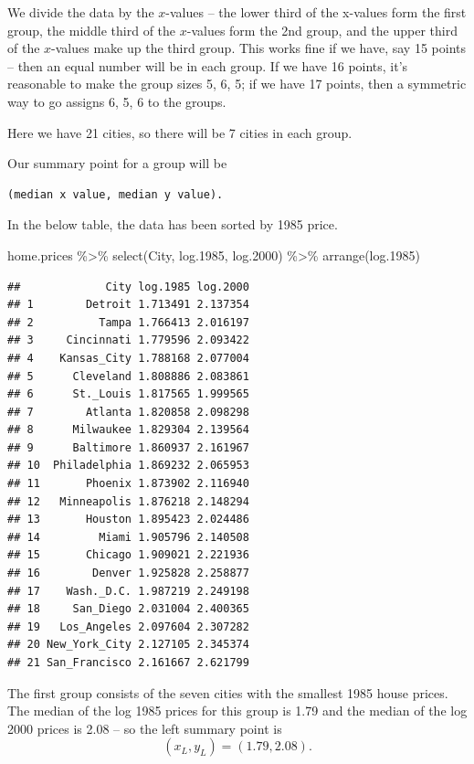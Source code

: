 \documentclass[
]{book}
\newenvironment{Shaded}{\begin{snugshade}}{\end{snugshade}}
\newcommand{\FloatTok}[1]{\textcolor[rgb]{0.00,0.00,0.81}{#1}}
\newcommand{\FunctionTok}[1]{\textcolor[rgb]{0.00,0.00,0.00}{#1}}
\newcommand{\NormalTok}[1]{#1}
\newcommand{\SpecialCharTok}[1]{\textcolor[rgb]{0.00,0.00,0.00}{#1}}
\begin{document}
We divide the data by the \(x\)-values -- the lower third of the x-values form the first group, the middle third of the \(x\)-values form the 2nd group, and the upper third of the \(x\)-values make up the third group. This works fine if we have, say 15 points -- then an equal number will be in each group. If we have 16 points, it's reasonable to make the group sizes 5, 6, 5; if we have 17 points, then a symmetric way to go assigns 6, 5, 6 to the groups.

Here we have 21 cities, so there will be 7 cities in each group.

Our summary point for a group will be

\begin{verbatim}
(median x value, median y value).
\end{verbatim}

In the below table, the data has been sorted by 1985 price.

\begin{Shaded}
\begin{Highlighting}[]
\NormalTok{home.prices }\SpecialCharTok{\%\textgreater{}\%} 
  \FunctionTok{select}\NormalTok{(City, log}\FloatTok{.1985}\NormalTok{, log}\FloatTok{.2000}\NormalTok{) }\SpecialCharTok{\%\textgreater{}\%} 
  \FunctionTok{arrange}\NormalTok{(log}\FloatTok{.1985}\NormalTok{)}
\end{Highlighting}
\end{Shaded}

\begin{verbatim}
##             City log.1985 log.2000
## 1        Detroit 1.713491 2.137354
## 2          Tampa 1.766413 2.016197
## 3     Cincinnati 1.779596 2.093422
## 4    Kansas_City 1.788168 2.077004
## 5      Cleveland 1.808886 2.083861
## 6      St._Louis 1.817565 1.999565
## 7        Atlanta 1.820858 2.098298
## 8      Milwaukee 1.829304 2.139564
## 9      Baltimore 1.860937 2.161967
## 10  Philadelphia 1.869232 2.065953
## 11       Phoenix 1.873902 2.116940
## 12   Minneapolis 1.876218 2.148294
## 13       Houston 1.895423 2.024486
## 14         Miami 1.905796 2.140508
## 15       Chicago 1.909021 2.221936
## 16        Denver 1.925828 2.258877
## 17    Wash._D.C. 1.987219 2.249198
## 18     San_Diego 2.031004 2.400365
## 19   Los_Angeles 2.097604 2.307282
## 20 New_York_City 2.127105 2.345374
## 21 San_Francisco 2.161667 2.621799
\end{verbatim}

The first group consists of the seven cities with the smallest 1985 house prices. The median of the log 1985 prices for this group is 1.79 and the median of the log 2000 prices is 2.08 -- so the left summary point is
\[
(x_L, y_L) = (1.79, 2.08).
\]
\end{document}
